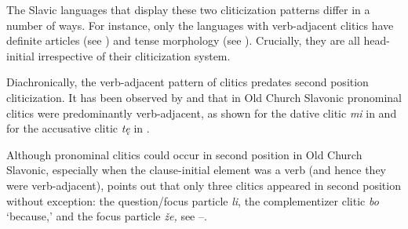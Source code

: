 \documentclass[output=paper,
modfonts,
newtxmath,
hidelinks
]{langscibook}
\begin{document}
\ea \label{11:ex7}
	\label{11:ex7a}
 	\label{11:ex7b}
 	\z
\z
The Slavic languages that display these two cliticization patterns differ in a number of ways. For instance, only the languages with verb-adjacent clitics have definite articles (see \citealt{boskovic2016}) and tense morphology (see \citealt{migdalski2015,migdalski2016}). Crucially, they are all head-initial irrespective of their cliticization system.

Diachronically, the verb-adjacent pattern of clitics predates second position cliticization. It has been observed by \citet{radanovickocic1988} and \citet{pancheva2005} that in Old Church Slavonic pronominal clitics were predominantly verb-adjacent, as shown for the dative clitic \textit{mi} in  and for the accusative clitic \textit{tę} in .

\ea \label{11:ex8}
	\label{11:ex8a}
	\label{11:ex8b}
	\z
\z
Although pronominal clitics could occur in second position in Old Church Slavonic, especially when the clause-initial element was a verb (and hence they were verb-adjacent), \citet{radanovickocic1988} points out that only three clitics appeared in second position without exception: the question/focus particle \textit{li}, the complementizer clitic \textit{bo} ‘because,’ and the focus particle \textit{že,} see --. 
\end{document}
